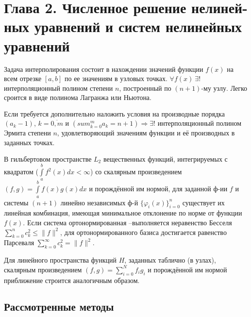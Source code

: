 \newpage
{}
\pagestyle{empty}
\vspace{0.5cm}

\section*{Глава 2. Численное решение нелиней- ных уравнений и систем нелинейных уравнений}

    Задача интерполирования состоит в нахождении значений функции $f(x)$
    на всем отрезке $[a,b]$ по ее значениям в узловых точках. $\forall f(x)~\exists!$ интерполяционный полином степени $n$, построенный по $(n+1)$-му узлу. Легко сроится в виде полинома Лагранжа или Ньютона.

Если требуется дополнительно наложить условия на производные порядка $(a_k-1)$, $k = \overline{0,m}$ и $(sum_{k=0}^m a_k = n + 1) \Rightarrow \exists!$ интерполяционный полином Эрмита степени $n$, удовлетворяющий значениям функции и её производных в заданных точках.

В гильбертовом пространстве $L_2$ вещественных функций, интегрируемых с квадратом ($\int\limits_a^b{f^2(x)dx} < \infty$) со скалярным произведением $(f,g)=\int\limits_a^b{f(x)g(x)dx}$ и порождённой им нормой, для заданной ф-ии $f$ и системы $(n+1)$ линейно независимых ф-й $\{\varphi_i(x)\}_{i=0}^n$ существует их линейная комбинация, имеющая минимальное отклонение по норме от функции $f(x)$. Если система ортонормированная –выполняется неравенство Бесселя $\sum_{k=0}^n c_k^2 \leqslant \|f\|^2$, для ортонормированного базиса достигается равенство Парсеваля $\sum_{k=0}^\infty c_k^2 = \|f\|^2.$

Для линейного пространства функций $H$, заданных таблично (в узлах),  скалярным произведением $(f,g) = \sum\limits_{i=0}^N f_i g_i$ и порождённой им нормой приближение строится аналогичным образом.

\subsection{Рассмотренные методы}